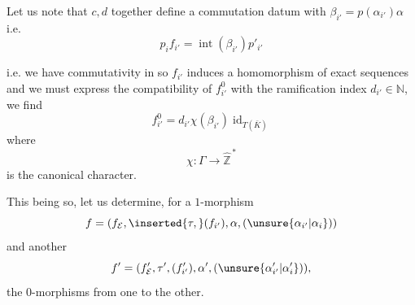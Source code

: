 Let us note that $c,d$ together define a commutation datum
with $\beta_{i'}=p(\alpha_{i'})\alpha$
i.e.
\[
p_i f_{i'}=\operatorname{int}(\beta_{i'})p'_{i'}
\]


i.e. we have commutativity in
so $f_{i'}$ induces a homomorphism of exact sequences
and we must express the compatibility of $f^0_{i'}$ with the ramification index $d_{i'}\in\mathbb N$, we find
\[
\boxed{f^0_{i'}=d_{i'}\chi(\beta_{i'})\operatorname{id}_{T(\bar K)}}
\]
where
\[
\chi:\Gamma\longrightarrow\widehat{\mathbb Z}^{\,*}
\]
is the canonical character.

This being so, let us determine, for a $1$-morphism
\[
f=(f_{\mathcal E},\inserted{\tau,}(f_{i'}),\alpha,(\unsure{\alpha_{i'}|\alpha_i}))
\]
and another
\[
f'=(f'_{\mathcal E},\tau',(f'_{i'}),\alpha',(\unsure{\alpha'_{i'}|\alpha'_i})),
\]
the $0$-morphisms from one to the other.
